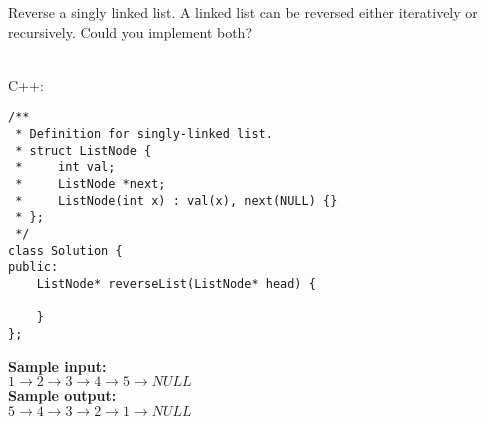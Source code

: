 \documentclass[a4paper]{article}
\begin{document}
Reverse a singly linked list. A linked list can be reversed either iteratively or recursively. Could you implement both?

\ \\

\noindent C++:

\begin{lstlisting}[style=C++]
/**
 * Definition for singly-linked list.
 * struct ListNode {
 *     int val;
 *     ListNode *next;
 *     ListNode(int x) : val(x), next(NULL) {}
 * };
 */
class Solution {
public:
    ListNode* reverseList(ListNode* head) {
        
    }
};
\end{lstlisting}

\LINE

\noindent \textbf{Sample input:}\\
$1 \rightarrow 2 \rightarrow 3 \rightarrow 4 \rightarrow 5 \rightarrow NULL$\\

\noindent \textbf{Sample output:}\\
$5 \rightarrow 4 \rightarrow 3 \rightarrow 2 \rightarrow 1 \rightarrow NULL$\\
\end{document}

